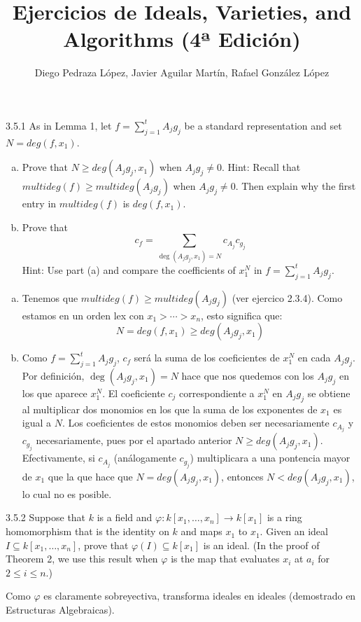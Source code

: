 \documentclass[twoside]{article}
\begin{document}
\title{Ejercicios de Ideals, Varieties, and Algorithms (4ª Edición)}
\author{Diego Pedraza López, Javier Aguilar Martín, Rafael González López}
\maketitle

\begin{ejercicio}{3.5.1}
As in Lemma 1, let $f = \sum_{j=1}^t A_j g_j$ be a standard representation and set $N = deg(f,x_1)$.
\begin{enumerate}[a.]
\item Prove that $N \geq deg(A_j g_j, x_1)$ when $A_j g_j \neq 0$.
Hint: Recall that $multideg(f) \geq multideg(A_j g_j)$ when $A_j g_j \neq 0$.
Then explain why the first entry in $multideg(f)$ is $deg(f,x_1)$.
\item Prove that
\[ c_f = \sum_{\deg(A_j g_j, x_1) = N} c_{A_j}c_{g_j} \]
Hint: Use part (a) and compare the coefficients of $x_1^N$ in $f = \sum_{j=1}^t A_j g_j$.
\end{enumerate}
\end{ejercicio}
\begin{solucion}\mbox{}
\begin{enumerate}[(a)]
\item Tenemos que $multideg(f) \geq multideg(A_j g_j)$ (ver ejercico 2.3.4).
Como estamos en un orden lex con $x_1 > \cdots > x_n$, esto significa que:
\[ N = deg(f,x_1) \geq deg(A_j g_j, x_1) \]
\item Como $f = \sum_{j=1}^t A_j g_j$, $c_f$ será la suma de los coeficientes de $x_1^N$ en cada $ A_j g_j$. Por definición, $\deg(A_j g_j, x_1) = N$ hace que nos quedemos con los $A_jg_j$ en los que aparece $x_1^N$. El coeficiente $c_j$ correspondiente a $x_1^N$ en $A_jg_j$ se obtiene al multiplicar dos monomios en los que la suma de los exponentes de $x_1$ es igual a $N$. Los coeficientes de estos monomios deben ser necesariamente $c_{A_j}$ y $c_{g_j}$ necesariamente, pues por el apartado anterior $N \geq deg(A_j g_j, x_1)$. Efectivamente, si $c_{A_j}$ (análogamente $c_{g_j}$) multiplicara a una pontencia mayor de $x_1$ que la que hace que $N = deg(A_j g_j, x_1)$, entonces  $N < deg(A_j g_j, x_1)$, lo cual no es posible. 
\end{enumerate}
\end{solucion}

\newpage

\begin{ejercicio}{3.5.2}
Suppose that $k$ is a field and $\varphi \colon k[x_1,\dots,x_n] \to k[x_1]$ is a ring homomorphism that is the identity on $k$ and maps $x_1$ to $x_1$.
Given an ideal $I \subseteq k[x_1,\dots,x_n]$, prove that $\varphi(I) \subseteq k[x_1]$ is an ideal.
(In the proof of Theorem 2, we use this result when $\varphi$ is the map that evaluates $x_i$ at $a_i$ for $2 \leq i \leq n$.)
\end{ejercicio}
\begin{solucion}
Como $\varphi$ es claramente sobreyectiva, transforma ideales en ideales (demostrado en Estructuras Algebraicas).
\end{solucion}
\end{document}
